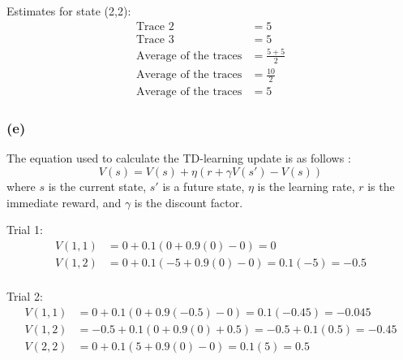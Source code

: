 \documentclass[10pt]{article}
\begin{document}
Estimates for state (2,2):
\begin{align*}
    \text{Trace 2} &= 5 \\
    \text{Trace 3} &= 5 \\
    \text{Average of the traces} &= \frac{5+5}{2} \\
    \text{Average of the traces} &= \frac{10}{2} \\
    \text{Average of the traces} &= 5
\end{align*}

\subsubsection*{(e)}

The equation used to calculate the TD-learning update is as follows \cite{engelbrecht2007computational}:
\begin{equation*}
    V(s) = V(s) + \eta (r + \gamma V(s') - V(s))
\end{equation*}
where $s$ is the current state, $s'$ is a future state, $\eta$ is the learning rate, $r$ is the
immediate reward, and $\gamma$ is the discount factor.

Trial 1:
\begin{align*}
    V(1,1) &= 0 + 0.1(0 + 0.9(0) - 0) = 0 \\
    V(1,2) &= 0 + 0.1(-5 + 0.9(0) - 0) = 0.1(-5) = -0.5 \\
\end{align*}

Trial 2:
\begin{align*}
    V(1,1) &= 0 + 0.1(0 + 0.9(-0.5) - 0) = 0.1(-0.45) = -0.045 \\
    V(1,2) &= -0.5 + 0.1(0 + 0.9(0) + 0.5) = -0.5 + 0.1(0.5) = -0.45 \\
    V(2,2) &= 0 + 0.1(5 + 0.9(0) - 0) = 0.1(5) = 0.5 \\
\end{align*}

 

\end{document}
